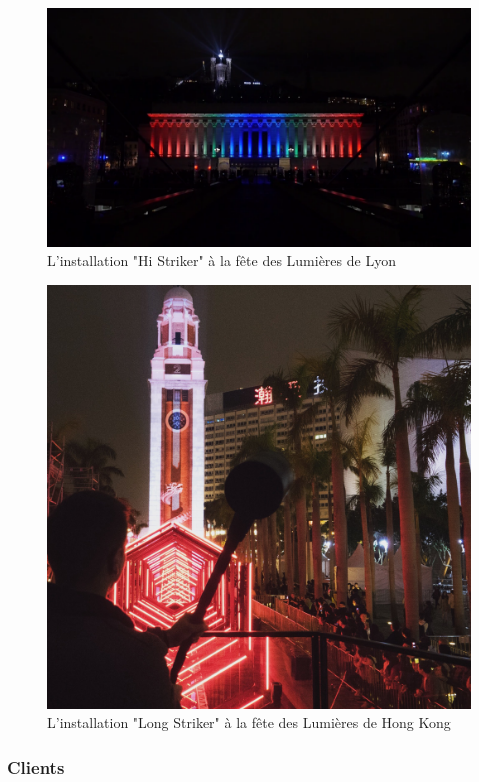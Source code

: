 \begin{figure}[h]
    \centering
    \includegraphics[scale=0.2]{img/hi-striker.png}
    \caption{L'installation "Hi Striker" à la fête des Lumières de Lyon}
\end{figure}


\begin{figure}[h]
    \centering
    \includegraphics[scale=0.15]{img/long-striker.jpg}
    \caption{L'installation "Long Striker" à la fête des Lumières de Hong Kong}
\end{figure}

\clearpage

\subsubsection{Clients}

